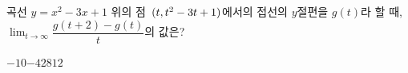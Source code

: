 곡선 $y=x^2-3x+1$ 위의 점~$(t{,}\mkern3mu\mathopen{}t^2-3t+1)$에서의 접선의 $y$절편을 $g(t)$라 할 때, $\displaystyle\lim_{t\to\infty}\dfrac{g(t+2)-g(t)}{t}$의 값은?
\begin{choices32}{$-10$}{$-4$}{$2$}{$8$}{$12$}\end{choices32}
